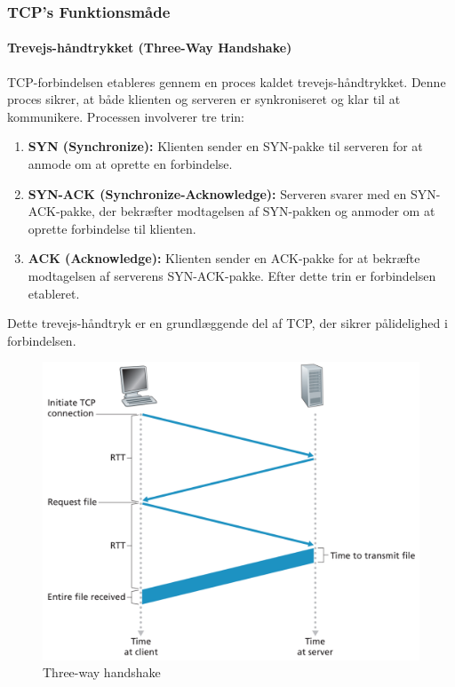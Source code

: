 \documentclass[12pt,a4paper]{book}
\begin{document}
	\subsubsection*{TCP's Funktionsmåde}
	\paragraph{Trevejs-håndtrykket (Three-Way Handshake)}
	TCP-forbindelsen etableres gennem en proces kaldet trevejs-håndtrykket. Denne proces sikrer, at både klienten og serveren er synkroniseret og klar til at kommunikere. Processen involverer tre trin:
	\begin{enumerate}
		\item \textbf{SYN (Synchronize):} Klienten sender en SYN-pakke til serveren for at anmode om at oprette en forbindelse.
		\item \textbf{SYN-ACK (Synchronize-Acknowledge):} Serveren svarer med en SYN-ACK-pakke, der bekræfter modtagelsen af SYN-pakken og anmoder om at oprette forbindelse til klienten.
		\item \textbf{ACK (Acknowledge):} Klienten sender en ACK-pakke for at bekræfte modtagelsen af serverens SYN-ACK-pakke. Efter dette trin er forbindelsen etableret.
	\end{enumerate}
	Dette trevejs-håndtryk er en grundlæggende del af TCP, der sikrer pålidelighed i forbindelsen.
	
	\begin{figure}[!h]
		\centering
		\includegraphics{fig/fig27.png}
		\caption{Three-way handshake}
	\end{figure}
	
\end{document}
